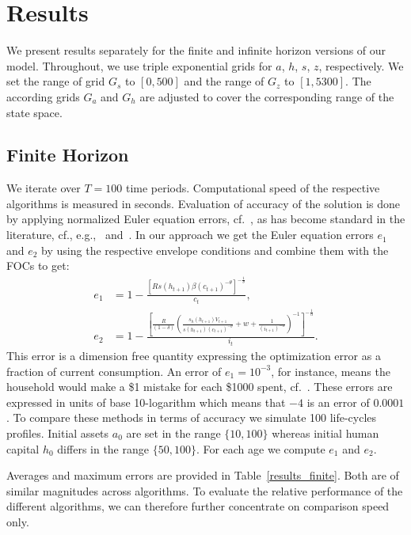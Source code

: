 \documentclass[a4paper,12pt]{article}
\begin{document}
\section{Results}

We present results separately for the finite and infinite horizon versions of our model. Throughout, we use triple exponential grids for $a$, $h$, $s$, $z$, respectively. We set the range of grid $G_{s}$ to $\left[0,500\right]$ and the range of $G_{z}$ to $\left[1,5300\right]$. The according grids $G_{a}$ and $G_{h}$ are adjusted to cover the corresponding range of the state space.

\subsection{Finite Horizon}

We iterate over $T=100$ time periods. Computational speed of the respective algorithms is measured in seconds. Evaluation of accuracy of the solution is done by applying normalized Euler equation errors, cf.~, as has become standard in the literature, cf., e.g.,~ and~. In our approach we get the Euler equation errors $e_{1}$ and $e_{2}$ by using the respective envelope conditions and combine them with the FOCs to get:
\begin{align*}
	e_{1} & = 1 - \frac{\left[R s(h_{t+1}) \beta \left(c_{t+1}\right)^{-\theta}\right]^{-\frac{1}{\theta}}}{c_{t}},  \\
	e_{2} & = 1 - \frac{\left[\frac{R} {\left(1 - \delta\right)} \left(\frac{s_{h}(h_{t+1}) V_{t+1}}{s(h_{t+1})\left(c_{t+1}\right)^{-\theta}} + w + \frac{1}{\left(i_{t+1}\right)^{-\alpha}}\right)^{-1}\right]^{-\frac{1}{\alpha}}}{i_{t}}.
\end{align*}
This error is a dimension free quantity expressing the optimization error as a fraction of current consumption. An error of $e_{1}=10^{-3}$, for instance, means the household would make a \$1 mistake for each \$1000 spent, cf.~. These errors are expressed in units of base 10-logarithm which means that $-4$ is an error of $0.0001$. To compare these methods in terms of accuracy we simulate 100 life-cycles profiles. Initial assets $a_{0}$ are set in the range $\{10,100\}$ whereas initial human capital $h_{0}$ differs in the range $\{50,100\}$. For each age we compute $e_{1}$ and $e_{2}$.

Averages and maximum errors are provided in Table~\ref{results_finite}. Both are of similar magnitudes across algorithms. To evaluate the relative performance of the different algorithms, we can therefore further concentrate on comparison speed only.
\end{document}
